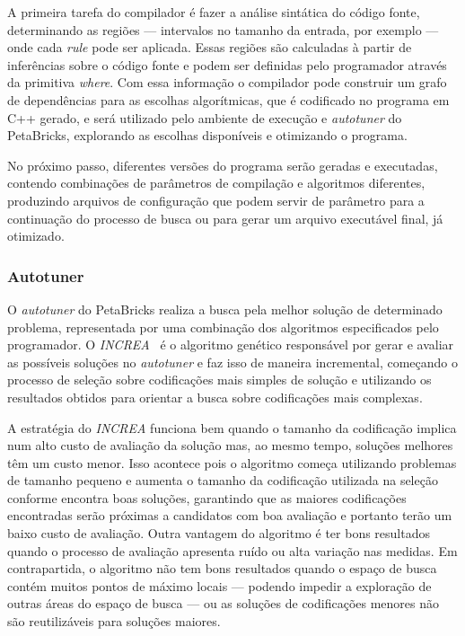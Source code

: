 \documentclass[a4paper, 12pt]{article}
\begin{document}
A primeira tarefa do compilador é fazer a análise sintática do código fonte, 
determinando as regiões --- intervalos no tamanho da entrada, por exemplo ---
onde cada \emph{rule} pode ser aplicada. Essas regiões são calculadas à partir
de inferências sobre o código fonte e podem ser definidas pelo programador
através da primitiva \emph{where}. Com essa informação o compilador pode 
construir um grafo de dependências para as escolhas algorítmicas,
que é codificado no programa em C++ gerado, e será utilizado pelo ambiente de
execução e \emph{autotuner} do PetaBricks, explorando as escolhas disponíveis
e otimizando o programa.

No próximo passo, diferentes versões do programa serão geradas e executadas, 
contendo combinações de parâmetros de compilação e algoritmos diferentes, 
produzindo arquivos de configuração que podem servir de parâmetro para a 
continuação do processo de busca ou para gerar um arquivo executável final, 
já otimizado.

\subsubsection{Autotuner}\label{sec:autotuner}

O \emph{autotuner} do PetaBricks realiza a busca pela melhor solução de 
determinado problema, representada por uma combinação dos algoritmos 
especificados pelo programador. O \emph{INCREA}~\citet{ansel2011efficient} é o 
algoritmo genético responsável por gerar e avaliar as possíveis soluções 
no \emph{autotuner} e faz isso de maneira incremental, começando
o processo de seleção sobre codificações mais simples de solução e utilizando 
os resultados obtidos para orientar a busca sobre codificações mais complexas.

A estratégia do \emph{INCREA} funciona bem quando o tamanho da codificação
implica num alto custo de avaliação da solução mas, ao mesmo tempo, soluções
melhores têm um custo menor. Isso acontece pois o algoritmo começa utilizando
problemas de tamanho pequeno e aumenta o tamanho da codificação utilizada na 
seleção conforme encontra boas soluções, garantindo que as maiores codificações
encontradas serão próximas a candidatos com boa avaliação e portanto terão um
baixo custo de avaliação. Outra vantagem do algoritmo é ter bons resultados
quando o processo de avaliação apresenta ruído ou alta variação nas medidas.
Em contrapartida, o algoritmo não tem bons resultados quando o espaço de busca
contém muitos pontos de máximo locais --- podendo impedir a 
exploração de outras áreas do espaço de busca --- ou as soluções de 
codificações menores não são reutilizáveis para soluções maiores.
\end{document}
